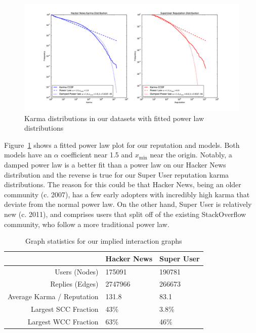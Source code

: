 \documentclass[11pt]{article}
\begin{document}
\begin{figure}[t]
\centering
\includegraphics[width=0.95\linewidth]{powerlaws-png}
\caption{Karma distributions in our datasets with fitted power law distributions}
\label{fig:powerlaws}
\end{figure}

Figure~\ref{fig:powerlaws} shows a fitted power law plot for our reputation and
models. Both models have an $\alpha$ coefficient near 1.5 and $x_{\text{min}}$
near the origin. Notably, a damped power law is a better fit than a power law on
our Hacker News distribution and the reverse is true for our Super User
reputation karma distributions. The reason for this could be that Hacker News,
being an older community (c. 2007), has a few early adopters with incredibly
high karma that deviate from the normal power law. On the other hand, Super User
is relatively new (c. 2011), and comprises users that split off of the existing
StackOverflow community, who follow a more traditional power law.

\begin{table}[t]
\begin{center}
\begin{tabular}{| r | l l |}
\hline
& \textbf{Hacker News} & \textbf{Super User} \\
\hline
Users (Nodes) & 175091 & 190781 \\
Replies (Edges) & 2747966 & 266673 \\
Average Karma / Reputation & 131.8 & 83.1 \\
Largest SCC Fraction & 43\% & 3.8\% \\
Largest WCC Fraction & 63\% & 46\% \\
\hline
\end{tabular}
\end{center}
\caption{Graph statistics for our implied interaction graphs}
\label{tab:graphstats}
\end{table}
\end{document}
